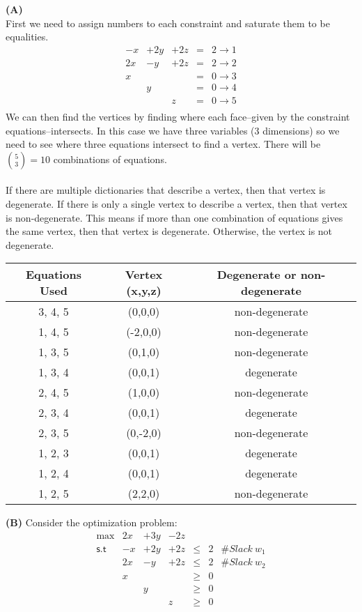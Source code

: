 \documentclass[11pt]{article}
\begin{document}
\noindent\textbf{(A)}
\\
First we need to assign numbers to each constraint and saturate them to be equalities.
\[\begin{array}{ccccc}
 -x & + 2 y & + 2z & = & 2 \rightarrow 1\\
2 x & - y & + 2z & = & 2 \rightarrow 2\\
x & & & = & 0 \rightarrow 3\\
& y& & = & 0 \rightarrow 4 \\
& & z & = & 0 \rightarrow 5\\
\end{array}\]
We can then find the vertices by finding where each face--given by the constraint equations--intersects.  In this case we have three variables (3 dimensions) so we need to see where three equations intersect to find a vertex.  There will be ${5 \choose 3} = 10$ combinations of equations.\\
\\
If there are multiple dictionaries that describe a vertex, then that vertex is degenerate.  If there is only a single vertex to describe a vertex, then that vertex is non-degenerate.  This means if more than one combination of equations gives the same vertex, then that vertex is degenerate.  Otherwise, the vertex is not degenerate. 
\begin{center}
\begin{tabular}{|c|c|c|}
\hline
Equations Used & Vertex (x,y,z) & Degenerate or non-degenerate \\ \hline
3, 4, 5 & (0,0,0) & non-degenerate \\ \hline
1, 4, 5 & (-2,0,0) & non-degenerate \\ \hline
1, 3, 5 & (0,1,0) & non-degenerate \\ \hline
1, 3, 4 & (0,0,1) & degenerate \\ \hline
2, 4, 5 & (1,0,0) & non-degenerate\\ \hline
2, 3, 4 & (0,0,1) & degenerate \\ \hline
2, 3, 5 & (0,-2,0) & non-degenerate \\ \hline
1, 2, 3 & (0,0,1) & degenerate \\ \hline
1, 2, 4 & (0,0,1) & degenerate \\ \hline
1, 2, 5 & (2,2,0) & non-degenerate \\ \hline
\end{tabular}
\end{center}

\noindent\textbf{(B)} Consider the optimization problem:
\[ \begin{array}{rcccccc}
\max & 2x & + 3y & - 2z \\
\mathsf{s.t} &  -x & + 2 y & + 2z & \leq & 2 & \# Slack\ w_1\\
& 2 x & - y & + 2z & \leq & 2 & \# Slack\ w_2\\
& x & & & \geq & 0\\
& & y& & \geq & 0 \\
& & & z & \geq & 0 \\
\end{array}\]
\end{document}
